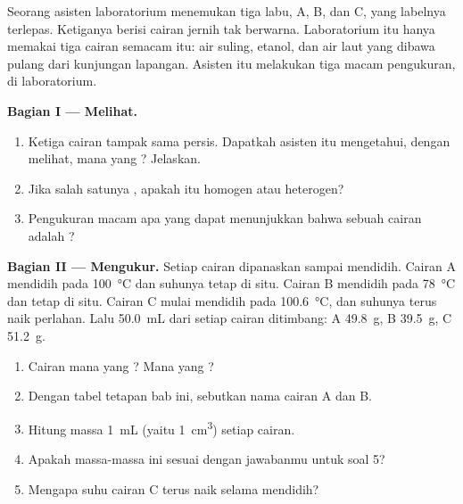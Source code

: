 \begin{problem}
\label{pb:g6:pure-substances-and-mixtures:1}
Seorang asisten laboratorium menemukan tiga labu, A, B, dan C, yang
labelnya terlepas. Ketiganya berisi cairan jernih tak berwarna.
Laboratorium itu hanya memakai tiga cairan semacam itu: air suling,
etanol, dan air laut yang dibawa pulang dari kunjungan lapangan. Asisten
itu melakukan tiga macam pengukuran, di laboratorium.

\medskip
\noindent\textbf{Bagian I --- Melihat.}
\begin{enumerate}
  \item Ketiga cairan tampak sama persis. Dapatkah asisten itu
        mengetahui, dengan melihat, mana yang ? Jelaskan.
  \item Jika salah satunya , apakah  itu homogen atau
        heterogen?
  \item Pengukuran macam apa yang dapat menunjukkan bahwa sebuah cairan
        adalah ?
\end{enumerate}

\medskip
\noindent\textbf{Bagian II --- Mengukur.}
Setiap cairan dipanaskan sampai mendidih. Cairan A mendidih pada
\qty{100}{\celsius} dan suhunya tetap di situ. Cairan B mendidih pada
\qty{78}{\celsius} dan tetap di situ. Cairan C mulai mendidih pada
\qty{100.6}{\celsius}, dan suhunya terus naik perlahan. Lalu
\qty{50.0}{mL} dari setiap cairan ditimbang: A \qty{49.8}{g}, B
\qty{39.5}{g}, C \qty{51.2}{g}.
\begin{enumerate}[resume]
  \item Cairan mana yang ? Mana yang ?
  \item Dengan tabel tetapan bab ini, sebutkan nama cairan A dan B.
  \item Hitung massa \qty{1}{mL} (yaitu \qty{1}{cm^3}) setiap cairan.
  \item Apakah massa-massa ini sesuai dengan jawabanmu untuk soal 5?
  \item Mengapa suhu cairan C terus naik selama mendidih?
\end{enumerate}


\end{problem}
